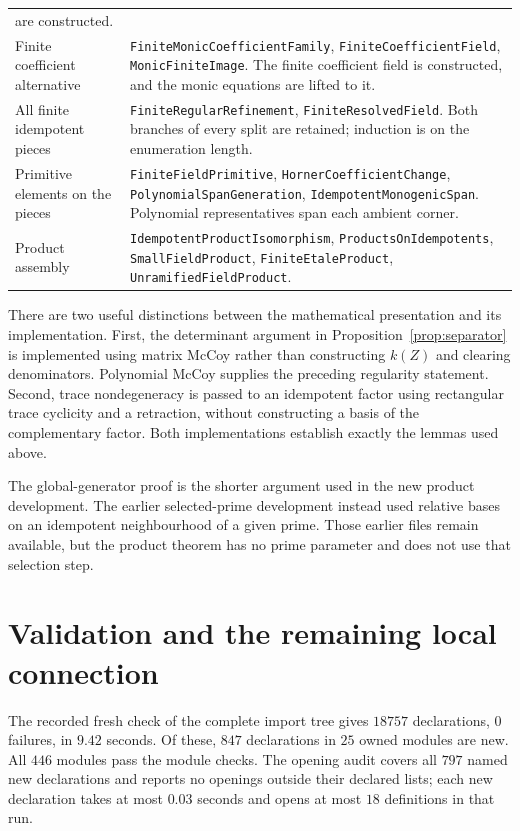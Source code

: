 \documentclass[11pt]{article}
\theoremstyle{definition}
\theoremstyle{remark}
\begin{document}
\begin{longtable}{@{}>{\raggedright\arraybackslash}p{}
 >{\raggedright\arraybackslash}p{}@{}}
are constructed.\\[5pt]
Finite coefficient alternative &
\texttt{FiniteMonicCoefficientFamily}, \texttt{FiniteCoefficientField},
\texttt{MonicFiniteImage}. The finite coefficient field is constructed,
and the monic equations are lifted to it.\\[5pt]
All finite idempotent pieces &
\texttt{FiniteRegularRefinement}, \texttt{FiniteResolvedField}.
Both branches of every split are retained; induction is on the
enumeration length.\\[5pt]
Primitive elements on the pieces &
\texttt{FiniteFieldPrimitive}, \texttt{HornerCoefficientChange},
\texttt{PolynomialSpanGeneration}, \texttt{IdempotentMonogenicSpan}.
Polynomial representatives span each ambient corner.\\[5pt]
Product assembly &
\texttt{IdempotentProductIsomorphism}, \texttt{ProductsOnIdempotents},
\texttt{SmallFieldProduct}, \texttt{FiniteEtaleProduct},
\texttt{UnramifiedFieldProduct}.\\
\end{longtable}

There are two useful distinctions between the mathematical presentation
and its implementation. First, the determinant argument in
Proposition~\ref{prop:separator} is implemented using matrix McCoy
rather than constructing $k(Z)$ and clearing denominators. Polynomial
McCoy supplies the preceding regularity statement. Second, trace
nondegeneracy is passed to an idempotent factor using rectangular
trace cyclicity and a retraction, without constructing a basis of the
complementary factor. Both implementations establish exactly the
lemmas used above.

The global-generator proof is the shorter argument used in the new
product development. The earlier selected-prime development instead
used relative bases on an idempotent neighbourhood of a given prime.
Those earlier files remain available, but the product theorem has no
prime parameter and does not use that selection step.

\section{Validation and the remaining local connection}

The recorded fresh check of the complete import tree gives
$18757$ declarations, $0$ failures, in $9.42$ seconds.
Of these, $847$ declarations in $25$ owned modules are new.
All $446$ modules pass the module checks. The opening audit covers
all $797$ named new declarations and reports no openings outside
their declared lists; each new declaration takes at most $0.03$
seconds and opens at most $18$ definitions in that run.
\end{document}

